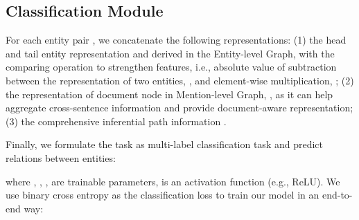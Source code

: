 \documentclass[11pt,a4paper]{article}
\begin{document}
\subsection{Classification Module\label{ssec:classification}}
For each entity pair , we concatenate the following representations: (1) the head and tail entity representation  and  derived in the Entity-level Graph, with the comparing operation \citep{mou-etal-16-natural} to strengthen features, i.e., absolute value of subtraction between the representation of two entities, , and element-wise multiplication, ; (2) the representation of document node in Mention-level Graph, , as it can help aggregate cross-sentence information and provide document-aware representation; (3) the comprehensive inferential path information .


Finally, we formulate the task as multi-label classification task and predict relations between entities:

where , , ,  are trainable parameters,  is an activation function (e.g., ReLU). We use binary cross entropy as the classification loss to train our model in an end-to-end way:
\end{document}
